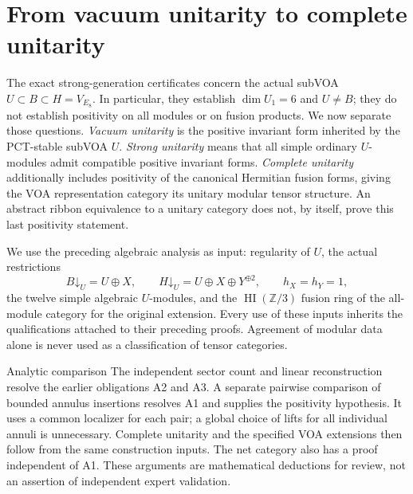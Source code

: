 
\section{From vacuum unitarity to complete unitarity}
\label{sec:analytic-unitarity}

The exact strong-generation certificates concern the actual subVOA
$U\subset B\subset H=V_{E_8}$.  In particular, they establish
$\dim U_1=6$ and $U\ne B$; they do not establish positivity on all
modules or on fusion products.  We now separate those questions.
\emph{Vacuum unitarity} is the positive invariant form inherited by the
PCT-stable subVOA $U$.  \emph{Strong unitarity} means that all simple
ordinary $U$-modules admit compatible positive invariant forms.
\emph{Complete unitarity} additionally includes positivity of the
canonical Hermitian fusion forms, giving the VOA representation category
its unitary modular tensor structure.  An abstract ribbon equivalence to
a unitary category does not, by itself, prove this last positivity statement.

We use the preceding algebraic analysis as input: regularity of $U$,
the actual restrictions
\begin{equation}
 B\mathord\downarrow_U=U\oplus X,
 \qquad
 H\mathord\downarrow_U=U\oplus X\oplus Y^{\oplus2},
 \qquad h_X=h_Y=1,
 \label{eq:analytic-branching}
\end{equation}
the twelve simple algebraic $U$-modules, and the
$\operatorname{HI}(\mathbb Z/3)$ fusion ring of the all-module category
for the original extension.  Every use of these inputs inherits the
qualifications attached to their preceding proofs.  Agreement of modular
data alone is never used as a classification of tensor categories.

\begin{reviewnote}{Analytic comparison}
The independent sector count and linear reconstruction resolve the
earlier obligations A2 and A3.  A separate pairwise comparison of
bounded annulus insertions resolves A1 and supplies the positivity
hypothesis.  It uses a common localizer for each pair; a global choice
of lifts for all individual annuli is unnecessary.  Complete unitarity
and the specified VOA extensions then follow from the same construction
inputs.  The net category also has a proof independent of A1.  These
arguments are mathematical deductions for review, not an assertion of
independent expert validation.
\end{reviewnote}


